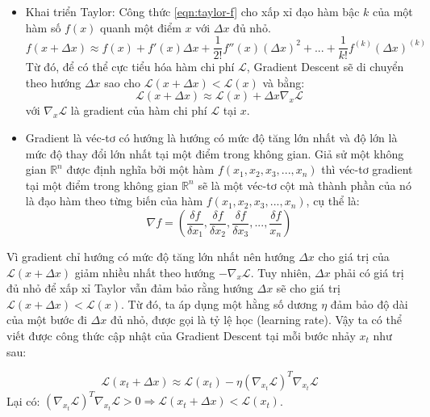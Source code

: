 \begin{itemize}
	\item Khai triển Taylor: Công thức \ref{eqn:taylor-f} cho xấp xỉ đạo hàm bậc $k$ của một hàm số $f(x)$ quanh một điểm $x$ với $\Delta x$ đủ nhỏ.
	\begin{equation} \label{eqn:taylor-f}
		f(x + \Delta x) \approx f(x) + f'(x)\Delta x + \frac{1}{2!}f''(x)(\Delta x)^2 +...+ \frac{1}{k!}f^{(k)} (\Delta x)^{(k)}
	\end{equation}
	Từ đó, để có thể cực tiểu hóa hàm chi phí $\mathcal{L}$, Gradient Descent sẽ di chuyển theo hướng $\Delta x$ sao cho $\mathcal{L}(x + \Delta x) < \mathcal{L}(x)$ và bằng:
	\begin{equation} \label{eqn:l_x-delta}
	\mathcal{L}(x + \Delta x) \approx \mathcal{L}(x) + \Delta x\nabla_x \mathcal{L}
	\end{equation}
	với $\nabla_x\mathcal{L}$ là gradient của hàm chi phí $\mathcal{L}$ tại $x$.

	\item Gradient là véc-tơ có hướng là hướng có mức độ tăng lớn nhất và độ lớn là mức độ thay đổi lớn nhất tại một điểm trong không gian. Giả sử một không gian $\mathbb{R}^n$ được định nghĩa bởi một hàm $f(x_1,x_2,x_3,...,x_n)$ thì véc-tơ gradient tại một điểm trong không gian $\mathbb{R}^n$ sẽ là một véc-tơ cột mà thành phần của nó là đạo hàm theo từng biến của hàm $f(x_1,x_2,x_3,...,x_n)$, cụ thể là:
	\begin{equation} \label{eqn:grad_f}
	\nabla f = (\frac{\delta f}{\delta x_1}, \frac{\delta f}{\delta x_2}, \frac{\delta f}{\delta x_3},...,\frac{\delta f}{x_n})
	\end{equation}
\end{itemize}

Vì gradient chỉ hướng có mức độ tăng lớn nhất nên hướng $\Delta x$ cho giá trị của $\mathcal{L} (x + \Delta x)$ giảm nhiều nhất theo hướng $-\nabla_x\mathcal{L}$. Tuy nhiên, $\Delta x$ phải có giá trị đủ nhỏ để xấp xỉ Taylor vẫn đảm bảo rằng hướng $\Delta x$ sẽ cho giá trị $\mathcal{L}(x + \Delta x) < \mathcal{L}(x)$. Từ đó, ta áp dụng một hằng số dương $\eta$ đảm bảo độ dài của một bước đi $\Delta x$ đủ nhỏ, được gọi là tỷ lệ học (learning rate). Vậy ta có thể viết được công thức cập nhật của Gradient Descent tại mỗi bước nhảy $x_t$ như sau:

\begin{equation} \label{eqn:L_x-delta}
\mathcal{L}(x_t + \Delta x) \approx \mathcal{L}(x_t) - \eta{(\nabla_{x_t} \mathcal{L})^T\nabla _{x_t}\mathcal{L}}
\end{equation}
Lại có: $(\nabla _{x_t}\mathcal{L})^T\nabla _{x_t} \mathcal{L} > 0 \Rightarrow \mathcal{L}(x_t + \Delta x) < \mathcal{L}(x_t)$.

